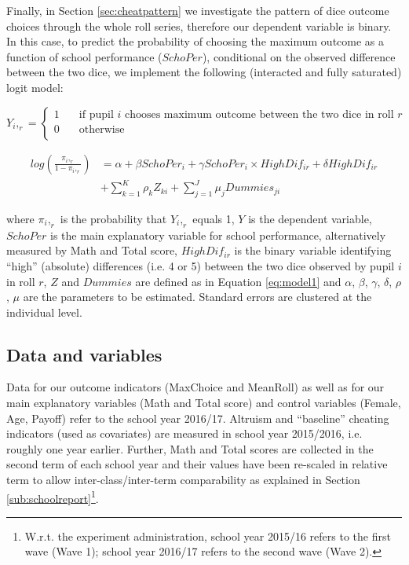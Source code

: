 \documentclass[authoryear, preprint, review, 12pt]{elsarticle}
\begin{document}
Finally, in Section \ref{sec:cheatpattern} we investigate the pattern of dice outcome choices through the whole roll series, therefore our dependent variable is binary. In this case, to predict the probability of choosing the maximum outcome as a function of school performance ($SchoPer$), conditional on the observed difference between the two dice, we implement the following (interacted and fully saturated) logit model:

\[ Y_i,_r =
\begin{cases}
 1  & \quad \text{if pupil $i$ chooses maximum outcome between the two dice in roll $r$} \\
 0  & \quad \text{otherwise}\\
\end{cases}
\]

\begin{equation}\begin{split}
\label{eq:logit}
log\left(\frac{\pi_i,_r}{1-\pi_i,_r}\right) &= \alpha + \beta SchoPer_{i} + \gamma SchoPer_{i}\times High Dif_{ir} + \delta High Dif_{ir} \\ 
                  &+ \sum\limits_{k=1}^K\rho_k Z_{ki} + \sum\limits_{j=1}^J\mu_j Dummies_{ji} 
\end{split}\end{equation}

where
$\pi_i,_r$ is the probability that $Y_i,_r$ equals 1, $Y$ is the dependent variable, $SchoPer$ is the main explanatory variable for school performance, alternatively measured by Math and Total score, $High Dif_{ir}$ is the binary variable identifying \enquote{high} (absolute) differences (i.e. 4 or 5) between the two dice observed by pupil $i$ in roll $r$, $Z$ and $Dummies$ are defined as in Equation \ref{eq:model1} and $\alpha$, $\beta$, $\gamma$, $\delta$, $\rho$, $\mu$ are the parameters to be estimated. Standard errors are clustered at the individual level.

\subsection{Data and variables}
\label{subsec: Data and variables}
Data for our outcome indicators (MaxChoice and MeanRoll) as well as for our main explanatory variables (Math and Total score) and control variables (Female, Age, Payoff) refer to the school year 2016/17. Altruism and \enquote{baseline} cheating indicators (used as covariates) are measured in school year 2015/2016, i.e. roughly one year earlier. Further, Math and Total scores are collected in the second term of each school year and their values have been re-scaled in relative term to allow inter-class/inter-term comparability as explained in Section \ref{sub:schoolreport}\footnote{W.r.t. the experiment administration, school year 2015/16 refers to the first wave (Wave 1); school year 2016/17 refers to the second wave (Wave 2).}.
\end{document}
